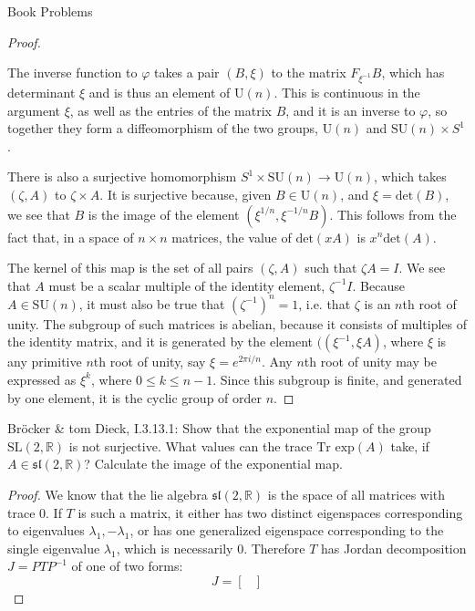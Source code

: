 \documentclass[12pt]{article}
\newcommand{\R}{\mathbb{R}}
\theoremstyle{definition}
\newenvironment{problem}[2][Problem]{\begin{trivlist}
\item[\hskip \labelsep {\bfseries #1}\hskip \labelsep {\bfseries #2.}]}{\end{trivlist}}
\begin{document}
\begin{section}{Book Problems}
\begin{proof}
\begin{enumerate}[label=(\roman*)]
			\par The inverse function to $\varphi$ takes a pair $(B, \xi) $ to the matrix $F_{\xi^{-1}}B$, which has determinant $\xi$ and is thus an element of $\text{U}(n)$. This is continuous in the argument $\xi$, as well as the entries of the matrix $B$, and it is an inverse to $\varphi$, so together they form a diffeomorphism of the two groups, $\text{U}(n)$ and $\text{SU}(n) \times S^1$.
	\end{enumerate}
	\par There is also a surjective homomorphism $S^1 \times \text{SU}(n) \to \text{U}(n)$, which takes $(\zeta, A)$ to $\zeta \times A$. It is surjective because, given $B \in \text{U}(n)$, and $\xi = \text{det}(B)$, we see that  $B$ is the image of the element $(\xi^{1/n}, \xi^{-1/n}B)$. This follows from the fact that, in a space of $n\times n$ matrices, the value of $\text{det}(xA)$ is $x^n\text{det}(A)$.
	\par The kernel of this map is the set of all pairs $(\zeta, A)$ such that $\zeta A = I$. We see that $A$ must be a scalar multiple of the identity element, $\zeta^{-1}I$. Because $A \in \text{SU}(n)$, it must also be true that $(\zeta^{-1})^{n} = 1$, i.e. that $\zeta$ is an $n$th root of unity. The subgroup of such matrices is abelian, because it consists of multiples of the identity matrix, and it is generated by the element $((\xi^{-1}, \xi A)$, where $\xi$ is any primitive $n$th root of unity, say $\xi = e^{2\pi i / n}$. Any $n$th root of unity may be expressed as $\xi^k$, where $0 \leq k \leq n-1$. Since this subgroup is finite, and generated by one element, it is the cyclic group of order $n$.
\end{proof}
\begin{problem}{5}
	Br\"ocker \& tom Dieck, I.3.13.1: Show that the exponential map of the group $\text{SL}(2, \R)$ is not surjective. What values can the trace $\text{Tr exp}(A)$ take, if $A \in \mathfrak{sl}(2,\R)$? Calculate the image of the exponential map.	
\end{problem}
\begin{proof}
	We know that the lie algebra $\mathfrak{sl}(2,\R)$ is the space of all matrices with trace $0$. If $T$ is such a matrix, it either has two distinct eigenspaces corresponding to eigenvalues $\lambda_1, -\lambda_1$, or has one generalized eigenspace corresponding to the single eigenvalue $\lambda_1$, which is necessarily $0$. Therefore $T$ has Jordan decomposition $J = PTP^{-1}$ of one of two forms:
	\[J = \begin{bmatrix}

\end{bmatrix}\]
\end{proof}
\end{section}
\end{document}
